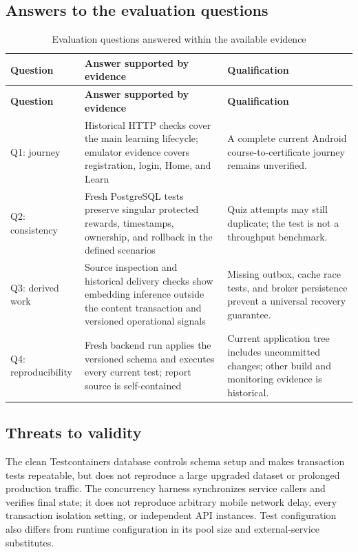 \documentclass[12pt,a4paper,oneside]{report}
\begin{document}
\subsection{Answers to the evaluation questions}
\begin{longtable}{P{0.13\textwidth}P{0.42\textwidth}P{0.34\textwidth}}
\caption{Evaluation questions answered within the available evidence}\\\toprule
\textbf{Question} & \textbf{Answer supported by evidence} & \textbf{Qualification}\\\midrule\endfirsthead
\toprule\textbf{Question} & \textbf{Answer supported by evidence} & \textbf{Qualification}\\\midrule\endhead
Q1: journey & Historical HTTP checks cover the main learning lifecycle; emulator evidence covers registration, login, Home, and Learn & A complete current Android course-to-certificate journey remains unverified.\\
Q2: consistency & Fresh PostgreSQL tests preserve singular protected rewards, timestamps, ownership, and rollback in the defined scenarios & Quiz attempts may still duplicate; the test is not a throughput benchmark.\\
Q3: derived work & Source inspection and historical delivery checks show embedding inference outside the content transaction and versioned operational signals & Missing outbox, cache race tests, and broker persistence prevent a universal recovery guarantee.\\
Q4: reproducibility & Fresh backend run applies the versioned schema and executes every current test; report source is self-contained & Current application tree includes uncommitted changes; other build and monitoring evidence is historical.\\
\bottomrule
\end{longtable}

\subsection{Threats to validity}
The clean Testcontainers database controls schema setup and makes transaction tests
repeatable, but does not reproduce a large upgraded dataset or prolonged production
traffic. The concurrency harness synchronizes service callers and verifies final state;
it does not reproduce arbitrary mobile network delay, every transaction isolation
setting, or independent API instances. Test configuration also differs from runtime
configuration in its pool size and external-service substitutes.
\end{document}
